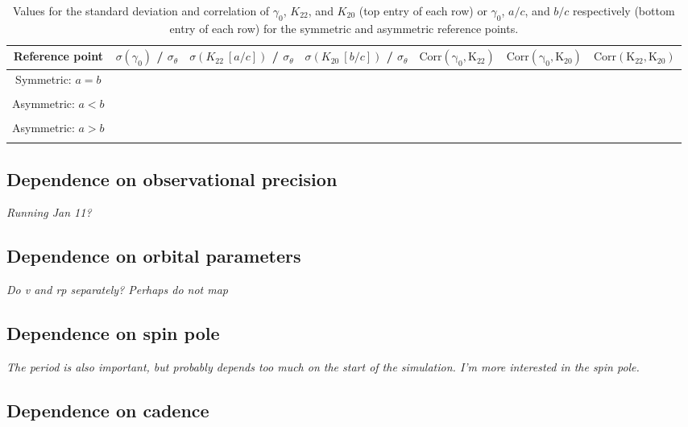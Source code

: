 \documentclass{aastex631}
\newcommand{\jtd}[1]{{\color{red}\textit{#1}}}
\begin{document}
\begin{table}
  \centering
  \begin{tabular}{c c c c c c c}
    \hline \hline
    Reference point & $\sigma(\gamma_0)$ / $\sigma_\theta$ & $\sigma(K_{22}\ [a/c])$ / $\sigma_\theta$ & $\sigma(K_{20}\ [b/c])$ / $\sigma_\theta$ & $\mathrm{Corr(\gamma_0, K_{22})}$ & $\mathrm{Corr(\gamma_0, K_{20})}$ & $\mathrm{Corr(K_{22}, K_{20})}$ \\ \hline
    Symmetric: $a=b$ &  &  &  &  &  & \\
    &  &  &  &  &  & \\
    Asymmetric: $a<b$ &  &  &  &  &  & \\
    &  &  &  &  &  & \\
    Asymmetric: $a>b$  &  &  &  &  &  & \\
    &  &  &  &  &  & \\
  \end{tabular}
  \caption{Values for the standard deviation and correlation of $\gamma_0$, $K_{22}$, and $K_{20}$ (top entry of each row) or $\gamma_0$, $a/c$, and $b/c$ respectively (bottom entry of each row) for the symmetric and asymmetric reference points.}
  \label{tab:probe-space-refernece-var-covar}
\end{table}


\subsection{Dependence on observational precision}
\label{sec:probe-sigma}

\jtd{Running Jan 11?}

\subsection{Dependence on orbital parameters}

\jtd{Do v and rp separately? Perhaps do not map}

\subsection{Dependence on spin pole}

\jtd{The period is also important, but probably depends too much on the start of the simulation. I'm more interested in the spin pole.}

\subsection{Dependence on cadence}
\end{document}
